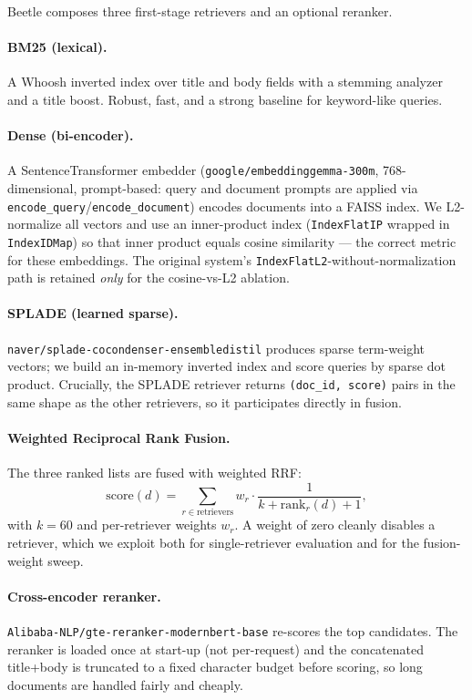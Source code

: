 \documentclass[11pt]{article}
\begin{document}
Beetle composes three first-stage retrievers and an optional reranker.

\paragraph{BM25 (lexical).} A Whoosh inverted index over title and body fields
with a stemming analyzer and a title boost. Robust, fast, and a strong baseline
for keyword-like queries.

\paragraph{Dense (bi-encoder).} A SentenceTransformer embedder
(\texttt{google/embeddinggemma-300m}, 768-dimensional, prompt-based: query and
document prompts are applied via \texttt{encode\_query}/\texttt{encode\_document})
encodes documents into a FAISS index. We L2-normalize all vectors and use an
inner-product index (\texttt{IndexFlatIP} wrapped in \texttt{IndexIDMap}) so that
inner product equals cosine similarity --- the correct metric for these
embeddings. The original system's \texttt{IndexFlatL2}-without-normalization path
is retained \emph{only} for the cosine-vs-L2 ablation.

\paragraph{SPLADE (learned sparse).} \texttt{naver/splade-cocondenser-ensembledistil}
produces sparse term-weight vectors; we build an in-memory inverted index and
score queries by sparse dot product. Crucially, the SPLADE retriever returns
\texttt{(doc\_id, score)} pairs in the same shape as the other retrievers, so it
participates directly in fusion.

\paragraph{Weighted Reciprocal Rank Fusion.} The three ranked lists are fused with
weighted RRF:
\[
  \mathrm{score}(d) = \sum_{r \in \text{retrievers}} w_r \cdot \frac{1}{k + \mathrm{rank}_r(d) + 1},
\]
with $k = 60$ and per-retriever weights $w_r$. A weight of zero cleanly disables a
retriever, which we exploit both for single-retriever evaluation and for the
fusion-weight sweep.

\paragraph{Cross-encoder reranker.} \texttt{Alibaba-NLP/gte-reranker-modernbert-base}
re-scores the top candidates. The reranker is loaded once at start-up (not
per-request) and the concatenated title+body is truncated to a fixed character
budget before scoring, so long documents are handled fairly and cheaply.
\end{document}
